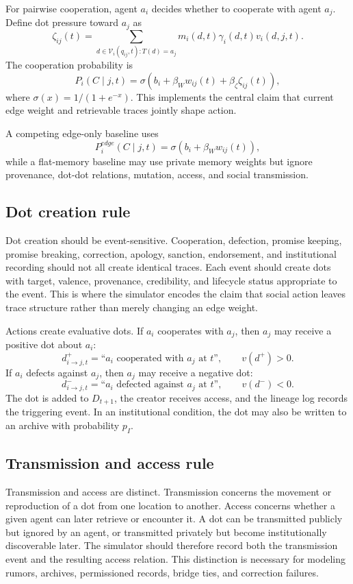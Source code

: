 \documentclass[11pt]{article}
\theoremstyle{remark}
\begin{document}
For pairwise cooperation, agent $a_i$ decides whether to cooperate with
agent $a_j$. Define dot pressure toward $a_j$ as
$$
\zeta_{ij}(t)=\sum_{d\in \mathcal V_i(q_{ij},t):T(d)=a_j}
 m_i(d,t)\gamma_i(d,t)v_i(d,j,t).
$$
The cooperation probability is
$$
P_i(C\mid j,t)=
\sigma\left(b_i+\beta_W w_{ij}(t)+\beta_\zeta \zeta_{ij}(t)\right),
$$
where $\sigma(x)=1/(1+e^{-x})$. This implements the central claim that
current edge weight and retrievable traces jointly shape action.

A competing edge-only baseline uses
$$
P_i^{edge}(C\mid j,t)=\sigma(b_i+\beta_W w_{ij}(t)),
$$
while a flat-memory baseline may use private memory weights but ignore
provenance, dot-dot relations, mutation, access, and social transmission.

\subsection{Dot creation rule}\label{minimal-dot-creation-rule}

Dot creation should be event-sensitive. Cooperation, defection, promise keeping, promise breaking, correction, apology, sanction, endorsement, and institutional recording should not all create identical traces. Each event should create dots with target, valence, provenance, credibility, and lifecycle status appropriate to the event. This is where the simulator encodes the claim that social action leaves trace structure rather than merely changing an edge weight.


Actions create evaluative dots. If $a_i$ cooperates with $a_j$, then
$a_j$ may receive a positive dot about $a_i$:
$$
d^+_{i\to j,t}=\text{``}a_i\text{ cooperated with }a_j\text{ at }t\text{''},
\qquad v(d^+)>0.
$$
If $a_i$ defects against $a_j$, then $a_j$ may receive a negative dot:
$$
d^-_{i\to j,t}=\text{``}a_i\text{ defected against }a_j\text{ at }t\text{''},
\qquad v(d^-)<0.
$$
The dot is added to $D_{t+1}$, the creator receives access, and the
lineage log records the triggering event. In an institutional condition,
the dot may also be written to an archive with probability $p_I$.

\subsection{Transmission and access rule}\label{transmission-and-access-rule}

Transmission and access are distinct. Transmission concerns the movement or reproduction of a dot from one location to another. Access concerns whether a given agent can later retrieve or encounter it. A dot can be transmitted publicly but ignored by an agent, or transmitted privately but become institutionally discoverable later. The simulator should therefore record both the transmission event and the resulting access relation. This distinction is necessary for modeling rumors, archives, permissioned records, bridge ties, and correction failures.
\end{document}
